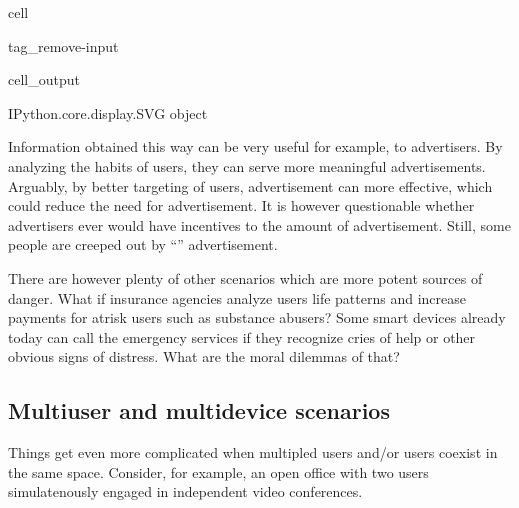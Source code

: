\documentclass[letterpaper,10pt,english]{jupyterBook}
\begin{document}
\begin{sphinxuseclass}{cell}
\begin{sphinxuseclass}{tag_remove-input}\begin{sphinxVerbatimOutput}

\begin{sphinxuseclass}{cell_output}
\begin{sphinxVerbatim}[commandchars=\\\{\}]
\PYGZlt{}IPython.core.display.SVG object\PYGZgt{}
\end{sphinxVerbatim}

\end{sphinxuseclass}\end{sphinxVerbatimOutput}

\end{sphinxuseclass}
\end{sphinxuseclass}
\sphinxAtStartPar
Information obtained this way can be very useful for example, to advertisers. By analyzing the habits of users, they can serve more meaningful advertisements. Arguably, by better targeting of users, advertisement can more effective, which could  reduce the need for advertisement. It is however questionable whether advertisers ever would have incentives to  the amount of advertisement.
Still, some people are creeped out by “” advertisement.

\sphinxAtStartPar
There are however plenty of other scenarios which are more potent sources of danger. What if insurance agencies analyze users life patterns and increase payments for at\sphinxhyphen{}risk users such as substance abusers? Some smart devices already today can call the emergency services if they recognize cries of help or other obvious signs of distress. What are the moral dilemmas of that?


\subsection{Multi\sphinxhyphen{}user and multi\sphinxhyphen{}device scenarios}
\label{\detokenize{Security_and_privacy:multi-user-and-multi-device-scenarios}}
\sphinxAtStartPar
Things get even more complicated when multipled users and/or users co\sphinxhyphen{}exist in the same space. Consider, for example, an open office with two users simulatenously engaged in independent video conferences.
\end{document}
